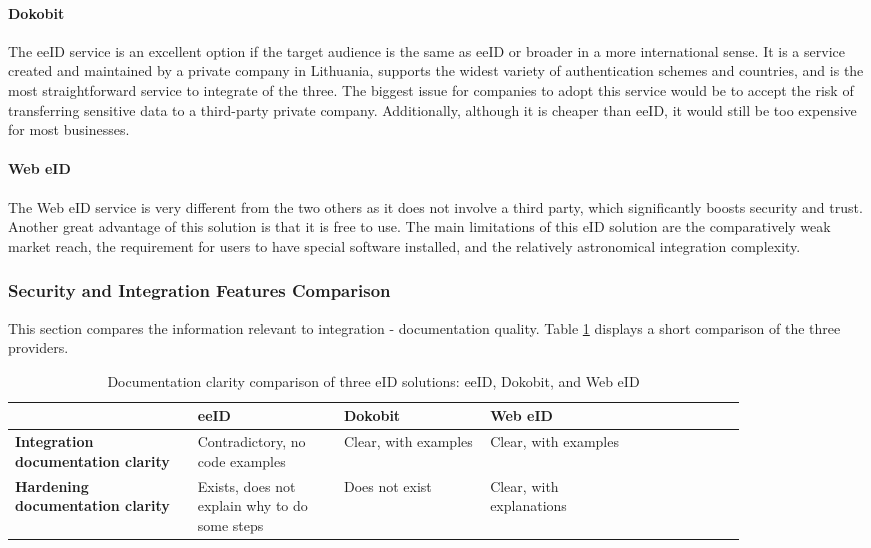 \paragraph{Dokobit}

The eeID service is an excellent option if the target audience is the same as eeID or broader in a more international sense. It is a service created and maintained by a private company in Lithuania, supports the widest variety of authentication schemes and countries, and is the most straightforward service to integrate of the three. The biggest issue for companies to adopt this service would be to accept the risk of transferring sensitive data to a third-party private company. Additionally, although it is cheaper than eeID, it would still be too expensive for most businesses.

\paragraph{Web eID}

The Web eID service is very different from the two others as it does not involve a third party, which significantly boosts security and trust. Another great advantage of this solution is that it is free to use. The main limitations of this eID solution are the comparatively weak market reach, the requirement for users to have special software installed, and the relatively astronomical integration complexity.

\subsubsection{Security and Integration Features Comparison}

This section compares the information relevant to integration - documentation quality. Table \ref{tbl:summary-comparison-docs} displays a short comparison of the three providers.

\begin{table}
    \centering
    \begin{tabular}{ >{\raggedright}p{0.25\linewidth} | >{\raggedright}p{0.2\linewidth} | >{\raggedright}p{0.2\linewidth} | >{\raggedright}p{0.2\linewidth} p{0px}}
                                                   & \textbf{eeID}                                 & \textbf{Dokobit}     & \textbf{Web eID}         & \\
        \hline
        \textbf{Integration documentation clarity} & Contradictory, no code examples               & Clear, with examples & Clear, with examples     & \\
        \hline
        \textbf{Hardening documentation clarity}   & Exists, does not explain why to do some steps & Does not exist       & Clear, with explanations & \\
    \end{tabular}
    \caption{Documentation clarity comparison of three eID solutions: eeID, Dokobit, and Web eID}
    \label{tbl:summary-comparison-docs}
\end{table}

